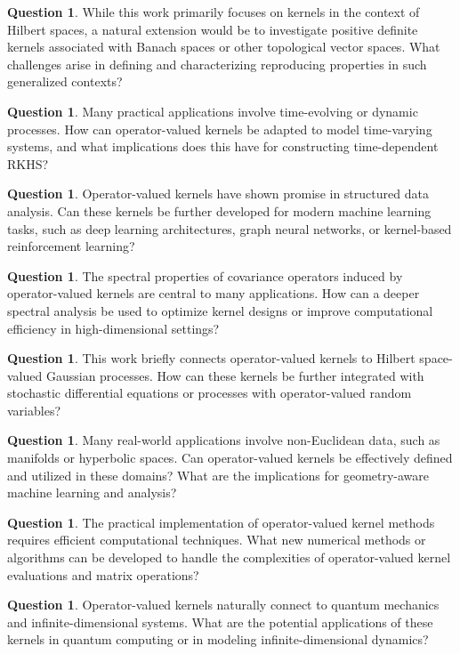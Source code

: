 \documentclass[11pt]{amsart}
\theoremstyle{definition}
\newtheorem{question}[theorem]{Question}
\numberwithin{equation}{section}
\begin{document}
\begin{question} While this work primarily focuses on kernels in the context of Hilbert spaces, a natural extension would be to investigate positive definite kernels associated with Banach spaces or other topological vector spaces. What challenges arise in defining and characterizing reproducing properties in such generalized contexts?
\end{question}
\begin{question} Many practical applications involve time-evolving or dynamic processes. How can operator-valued kernels be adapted to model time-varying systems, and what implications does this have for constructing time-dependent RKHS?
\end{question}
\begin{question} Operator-valued kernels have shown promise in structured data analysis. Can these kernels be further developed for modern machine learning tasks, such as deep learning architectures, graph neural networks, or kernel-based reinforcement learning?
\end{question}
\begin{question} The spectral properties of covariance operators induced by operator-valued kernels are central to many applications. How can a deeper spectral analysis be used to optimize kernel designs or improve computational efficiency in high-dimensional settings?
\end{question}
\begin{question} This work briefly connects operator-valued kernels to Hilbert space-valued Gaussian processes. How can these kernels be further integrated with stochastic differential equations or processes with operator-valued random variables?
\end{question}
\begin{question}
Many real-world applications involve non-Euclidean data, such as manifolds or hyperbolic spaces. Can operator-valued kernels be effectively defined and utilized in these domains? What are the implications for geometry-aware machine learning and analysis?
\end{question}
\begin{question}
The practical implementation of operator-valued kernel methods requires efficient computational techniques. What new numerical methods or algorithms can be developed to handle the complexities of operator-valued kernel evaluations and matrix operations?
\end{question}
\begin{question} 
Operator-valued kernels naturally connect to quantum mechanics and infinite-dimensional systems. What are the potential applications of these kernels in quantum computing or in modeling infinite-dimensional dynamics?
\end{question}
\end{document}
